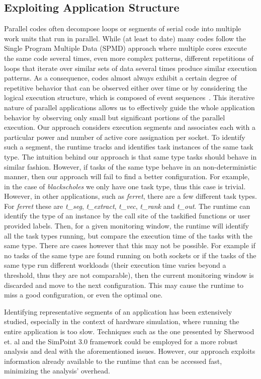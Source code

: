 \subsection{Exploiting Application Structure}
Parallel codes often decompose loops or segments of serial code into multiple work units
that run in parallel.  While (at least to date) many codes follow the Single Program
Multiple Data (SPMD) approach where multiple cores execute the same code several times,
even more complex patterns, different repetitions of loops that iterate over similar sets
of data several times produce similar execution patterns.  As a consequence, codes almost
always exhibit a certain degree of repetitive behavior that can be observed either over
time or by considering the logical execution structure, which is composed of event
sequences~\cite{Isaacs2015, Totoni2014, Casas2010}.  This iterative nature of parallel
applications allows us to effectively guide the whole application behavior by observing
only small but significant portions of the parallel execution.  Our approach considers
execution segments and associates each with a particular power and number of active core
assignation per socket. To identify such a segment, the runtime tracks and identifies task
instances of the same task type. 
The intuition behind our approach is that same type tasks should behave in similar
fashion.   However, if tasks of the same type behave in an non-deterministic manner,
then our approach will fail to find a better configuration.
For example, in the case of \textit{blackscholes} we only
have one task type, thus this case is trivial.  However, in other applications, such as
\textit{ferret}, there are a few different task types.  For \textit{ferret} these are
\textit{t\_seg}, \textit{t\_extract}, \textit{t\_vec}, \textit{t\_rank} and
\textit{t\_out}.  The runtime can identify the type of an instance by the call site of the
taskified functions or user provided labels. Then, for a given monitoring window, the
runtime will identify all the task types running, but compare the execution time of the
tasks with the same type.  There are cases however that this may not be possible.  For
example if no tasks of the same type are found running on both sockets or if the tasks
of the same type run different workloads (their execution time varies beyond a
threshold, thus they  are not comparable), 
then the current monitoring window is discarded and move to the next
configuration.  This may cause the runtime to miss a good configuration, or even the
optimal one.
\par
Identifying representative segments of an application has been extensively studied, 
especially in the context of hardware simulation, where running the entire 
application is too slow.  Techniques such as the one presented by Sherwood et. al
\cite{Sherwood:2001:BBD:645988.674158} and the SimPoint 3.0 framework \cite{simpoints3}
could be employed for a more robust analysis and deal with the aforementioned issues. 
However, our approach exploits information already available to the runtime that can be 
accessed fast, minimizing the analysis' overhead. 

